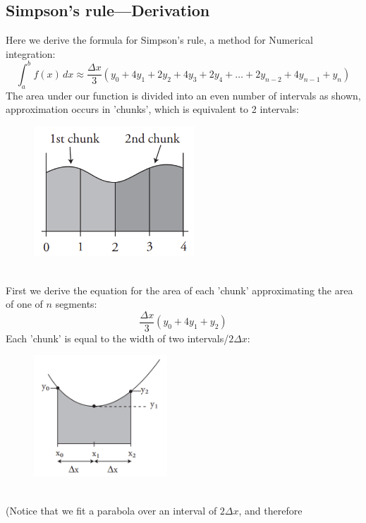 \documentclass{report}
\begin{document}
\subsection{Simpson's rule---Derivation} %
Here we derive the formula for Simpson's rule, a method for Numerical integration:
\begin{equation*}
\int_a^bf(x)\,dx\approx \frac{\Delta x}{3}(y_0+4y_1+2y_2
+4y_3+2y_4+\ldots+2y_{n-2}+4y_{n-1}+y_n) 
\end{equation*}
The area under our function is divided into an even number of intervals 
as shown, approximation occurs in 'chunks', which is equivalent to 2 intervals:
\begin{figure}[h]
\includegraphics[width=6cm]{Capture37}\\
\centering
{}
\end{figure}\\
First we derive the equation for the area of each 'chunk' approximating the area of
one of $n$ segments:
\begin{equation*}
\frac{\Delta x}{3}(y_0+4y_1+y_2)
\end{equation*}
Each 'chunk' is equal to the width of two intervals/$2\Delta x$:
\begin{figure}[h]
\includegraphics[width=5cm]{Capture36}\\
\centering
{}
\end{figure}\\
(Notice that we fit a parabola over an interval of $2\Delta x$, and therefore
\end{document}
